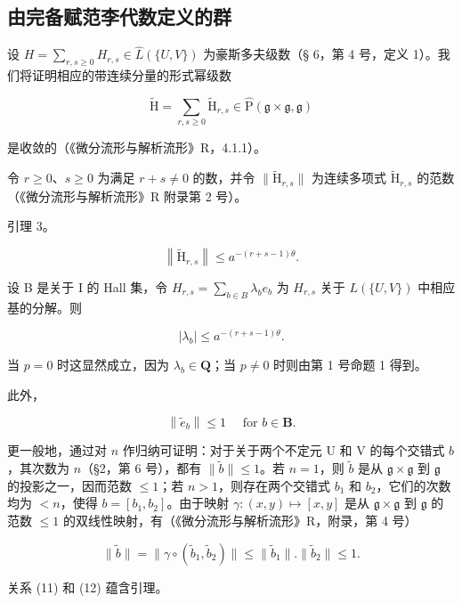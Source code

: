 \subsection{由完备赋范李代数定义的群}

设 \(H = \sum_{r,s \geq 0} H_{r,s} \in \hat{L}(\{U, V\})\) 为豪斯多夫级数（§ 6，第 4 号，定义 1）。我们将证明相应的带连续分量的形式幂级数

\[
\tilde {\mathrm{H}} = \sum_ {r, s \geqslant 0} \tilde {\mathrm{H}} _ {r, s} \in \hat {\mathrm{P}} (\mathfrak {g} \times \mathfrak {g}, \mathfrak {g})\tag{10}
\]

是收敛的（《微分流形与解析流形》R，4.1.1）。

令 \(r \geqslant 0\)、\(s \geqslant 0\) 为满足 \(r + s \neq 0\) 的数，并令 \(\| \tilde{\mathrm{H}}_{r,s} \|\) 为连续多项式 \(\tilde{\mathrm{H}}_{r,s}\) 的范数（《微分流形与解析流形》R 附录第 2 号）。

引理 3。

\[
\left\| \tilde {\mathrm{H}} _ {r, s} \right\| \leqslant a ^ {- (r + s - 1) \theta}.
\]

设 B 是关于 I 的 Hall 集，令 \(H_{r,s} = \sum_{b \in B} \lambda_b e_b\) 为 \(H_{r,s}\) 关于 \(L(\{U, V\})\) 中相应基的分解。则

\[
\left| \lambda_ {b} \right| \leqslant a ^ {- (r + s - 1) \theta}.\tag{11}
\]

当 \(p = 0\) 时这显然成立，因为 \(\lambda_b \in \mathbf{Q}\)；当 \(p \neq 0\) 时则由第 1 号命题 1 得到。

此外，

\[
\left\| \tilde {e} _ {b} \right\| \leqslant 1 \quad \text { for } b \in \mathbf {B}.\tag{12}
\]

更一般地，通过对 \(n\) 作归纳可证明：对于关于两个不定元 U 和 V 的每个交错式 \(b\)，其次数为 \(n\)（§2，第 6 号），都有 \(\| \tilde{b} \| \leqslant 1\)。若 \(n = 1\)，则 \(\tilde{b}\) 是从 \(\mathfrak{g} \times \mathfrak{g}\) 到 \(\mathfrak{g}\) 的投影之一，因而范数 \(\leqslant 1\)；若 \(n > 1\)，则存在两个交错式 \(b_1\) 和 \(b_2\)，它们的次数均为 \(< n\)，使得 \(b = [b_1, b_2]\)。由于映射 \(\gamma: (x, y) \mapsto [x, y]\) 是从 \(\mathfrak{g} \times \mathfrak{g}\) 到 \(\mathfrak{g}\) 的范数 \(\leqslant 1\) 的双线性映射，有（《微分流形与解析流形》R，附录，第 4 号）

\[
\| \tilde {b} \| = \| \gamma \circ (\tilde {b} _ {1}, \tilde {b} _ {2}) \| \leqslant \| \tilde {b} _ {1} \|. \| \tilde {b} _ {2} \| \leqslant 1.\tag{13}
\]

关系 (11) 和 (12) 蕴含引理。

